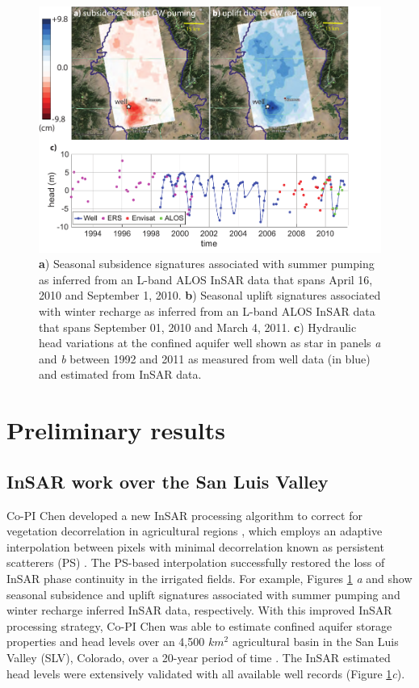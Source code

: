 \documentclass[11pt,final]{article}%
\renewcommand{\citep}{\cite}
\begin{document}
\begin{figure}
\centering
\noindent\includegraphics[width=.75\textwidth]{Figures/Figure3_small.pdf}
\caption{ \textbf{a}) Seasonal subsidence signatures associated with summer pumping as inferred from an L-band ALOS InSAR data that spans April 16, 2010 and September 1, 2010. \textbf{b}) Seasonal uplift signatures associated with winter recharge as inferred from an L-band ALOS InSAR data that spans September 01, 2010 and March 4, 2011. \textbf{c}) Hydraulic head variations at the confined aquifer well shown as star in panels \emph{a} and \emph{b} between 1992 and 2011 as measured from well data (in blue) and estimated from InSAR data. %
}
\label{fig:prelim insar}
\end{figure}

\section{Preliminary results}\label{sec:previous}
\subsection{InSAR work over the San Luis Valley}\label{sec:previous InSAR}

Co-PI Chen developed a new InSAR processing algorithm to correct for vegetation decorrelation in agricultural regions \cite{Chen2015}, which employs an adaptive interpolation between pixels with minimal decorrelation known as persistent scatterers (PS) \citep{Shanker2007}. The PS-based interpolation successfully restored the loss of InSAR phase continuity in the irrigated fields. For example, Figures \ref{fig:prelim insar} \emph{a} and  show seasonal subsidence and uplift signatures associated with summer pumping and winter recharge inferred InSAR data, respectively. With this improved InSAR processing strategy, Co-PI Chen  was able to estimate confined aquifer storage properties and head levels over an 4,500 $km^2$ agricultural basin in the San Luis Valley (SLV), Colorado, over a 20-year period of time \cite{Chen2017}. The InSAR estimated head levels were extensively validated with all available well records (Figure \ref{fig:prelim insar}\emph{c}).
\end{document}
